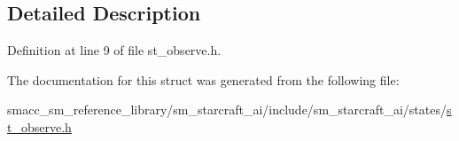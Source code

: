 \subsection{Detailed Description}


Definition at line 9 of file st\+\_\+observe.\+h.



The documentation for this struct was generated from the following file\+:\begin{DoxyCompactItemize}
\item 
smacc\+\_\+sm\+\_\+reference\+\_\+library/sm\+\_\+starcraft\+\_\+ai/include/sm\+\_\+starcraft\+\_\+ai/states/\hyperlink{st__observe_8h}{st\+\_\+observe.\+h}\end{DoxyCompactItemize}
